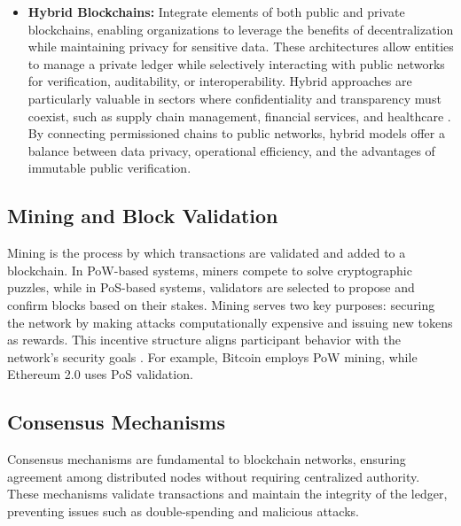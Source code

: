 \documentclass[final]{rc-book-2.14}
\begin{document}
\begin{itemize}
    \item \textbf{Hybrid Blockchains:} Integrate elements of both public and private blockchains, enabling organizations to leverage the benefits of decentralization while maintaining privacy for sensitive data. These architectures allow entities to manage a private ledger while selectively interacting with public networks for verification, auditability, or interoperability. Hybrid approaches are particularly valuable in sectors where confidentiality and transparency must coexist, such as supply chain management, financial services, and healthcare \cite{ahmed20222}. By connecting permissioned chains to public networks, hybrid models offer a balance between data privacy, operational efficiency, and the advantages of immutable public verification.

\end{itemize}

\subsection{Mining and Block Validation}

Mining is the process by which transactions are validated and added to a blockchain. In PoW-based systems, miners compete to solve cryptographic puzzles, while in PoS-based systems, validators are selected to propose and confirm blocks based on their stakes. Mining serves two key purposes: securing the network by making attacks computationally expensive and issuing new tokens as rewards. This incentive structure aligns participant behavior with the network’s security goals \cite{bonneau2015sok}. For example, Bitcoin employs PoW mining, while Ethereum 2.0 uses PoS validation.

\subsection{Consensus Mechanisms}

Consensus mechanisms are fundamental to blockchain networks, ensuring agreement among distributed nodes without requiring centralized authority. These mechanisms validate transactions and maintain the integrity of the ledger, preventing issues such as double-spending and malicious attacks.
\end{document}
